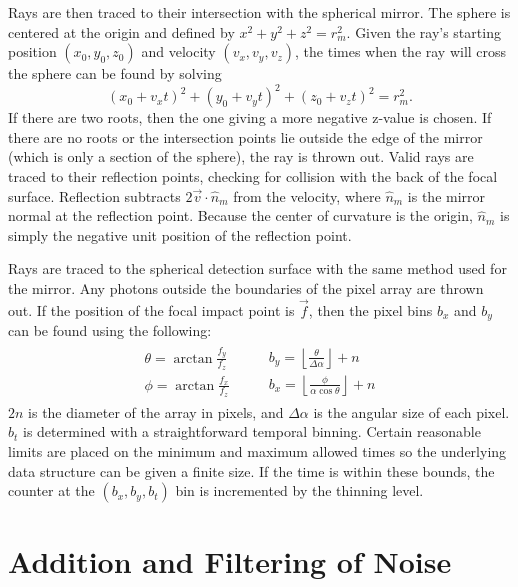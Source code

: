 Rays are then traced to their intersection with the spherical mirror. The sphere is centered at the origin and defined by $x^2 + y^2 + z^2 = r_m^2$. Given the ray's starting position $(x_0, y_0, z_0)$ and velocity $(v_x, v_y, v_z)$, the times when the ray will cross the sphere can be found by solving
\begin{equation}
    (x_0 + v_x t)^2 + (y_0 + v_y t)^2 + (z_0 + v_z t)^2 = r_m^2.
\end{equation}
If there are two roots, then the one giving a more negative z-value is chosen. If there are no roots or the intersection points lie outside the edge of the mirror (which is only a section of the sphere), the ray is thrown out. Valid rays are traced to their reflection points, checking for collision with the back of the focal surface. Reflection subtracts $2 \vec{v} \cdot \hat{n}_m$ from the velocity, where $\hat{n}_m$ is the mirror normal at the reflection point. Because the center of curvature is the origin, $\hat{n}_m$ is simply the negative unit position of the reflection point.

Rays are traced to the spherical detection surface with the same method used for the mirror. Any photons outside the boundaries of the pixel array are thrown out. If the position of the focal impact point is $\vec{f}$, then the pixel bins $b_x$ and $b_y$ can be found using the following:
\begin{gather}
    \begin{gathered}
        \theta = \arctan{\frac{f_y}{f_z}} \\
        \phi = \arctan{\frac{f_x}{f_z}}
    \end{gathered} \qquad
    \begin{gathered}
        b_y = \left\lfloor \frac{\theta}{\Delta \alpha} \right\rfloor + n \\
        b_x = \left\lfloor \frac{\phi}{\alpha \cos{\theta}} \right\rfloor + n
    \end{gathered}
\end{gather}
$2n$ is the diameter of the array in pixels, and $\Delta \alpha$ is the angular size of each pixel. $b_t$ is determined with a straightforward temporal binning. Certain reasonable limits are placed on the minimum and maximum allowed times so the underlying data structure can be given a finite size. If the time is within these bounds, the counter at the $(b_x, b_y, b_t)$ bin is incremented by the thinning level.

\section{Addition and Filtering of Noise} \label{sec:noise}

